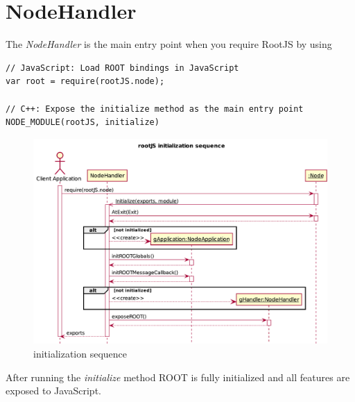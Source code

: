 \chapter{NodeHandler}
The \textit{NodeHandler} is the main entry point when you require RootJS by using
\begin{verbatim}
// JavaScript: Load ROOT bindings in JavaScript
var root = require(rootJS.node);

// C++: Expose the initialize method as the main entry point
NODE_MODULE(rootJS, initialize)
\end{verbatim}
\begin{figure}[H]
	\centering
	\includegraphics[width=18cm]{./latex/resources/initSequence.pdf}
	\caption{initialization sequence}
\end{figure}
After running the \textit{initialize} method ROOT is fully initialized and all features are exposed to JavaScript.
